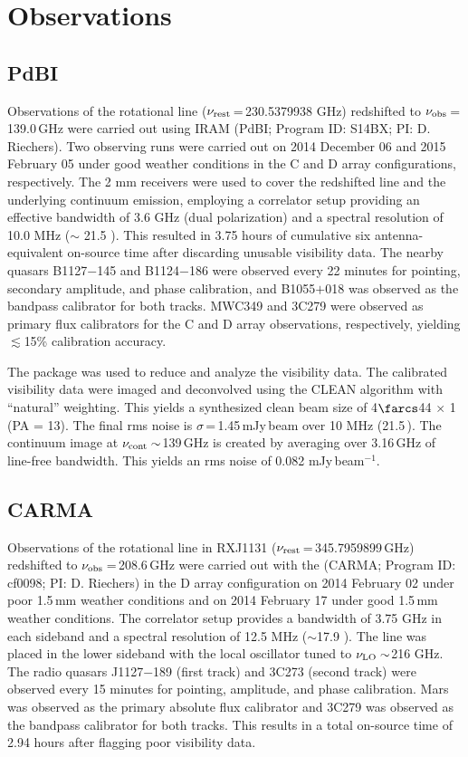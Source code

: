 \documentclass[]{emulateapj}
\begin{document}
\section{Observations} \label{sec:obs}
\subsection{PdBI \bco}
Observations of the \bco rotational line
($\nu_{\rm rest}$\,=\,230.5379938 GHz) redshifted to $\nu_{\rm obs}$\,=\,139.0\,GHz
were carried out using IRAM \pdbi (PdBI; Program ID: S14BX; PI: D.
Riechers). Two observing runs were carried out on 2014 December 06 and 2015
February 05 under good weather conditions in the C and D array configurations,
respectively. The 2 mm receivers were used to cover the redshifted \bco line
and the underlying continuum emission, employing a correlator setup providing
an effective bandwidth of 3.6 GHz (dual polarization) and a spectral resolution of 10.0 MHz ($\sim$
21.5 \kms). This resulted in 3.75 hours of cumulative six antenna-equivalent on-source
 time after discarding unusable visibility data.
The nearby quasars B1127$-$145 and B1124$-$186 were observed every 22 minutes
for pointing, secondary amplitude, and phase calibration, and B1055$+$018 was
observed as the bandpass calibrator for both tracks.
MWC349 and 3C279 were observed as primary flux calibrators for the C and D
array observations, respectively, yielding $\lesssim$15\% calibration accuracy.

The  package was used to reduce and analyze the visibility data.
The calibrated visibility data were imaged and deconvolved using the CLEAN algorithm with ``natural''
weighting. This yields a synthesized clean beam size of 4$\farcs$44 $\times$ 1 (PA = 13\degr).
The final rms noise is $\sigma$\,=\,1.45\,mJy\,beam\pmOne
over 10 MHz (21.5\,\kms). The continuum image at $\nu_{\rm cont}\sim$139\,GHz
is created by averaging over 3.16\,GHz of line-free bandwidth. This
yields an rms noise of 0.082 mJy\,beam$^{-1}$. %

\subsection{CARMA \cco}
Observations of the \cco rotational line in RXJ1131
($\nu_{\rm rest}$\,=\,345.7959899\,GHz) redshifted to $\nu_{\rm obs}$\,=\,208.6\,GHz
were carried out with the \carma (CARMA;
Program ID: cf0098; PI: D. Riechers)
in the D array configuration on 2014 February 02 under poor 1.5\,mm
weather conditions and on 2014 February 17 under good 1.5\,mm
weather conditions. The correlator setup provides a bandwidth of 3.75 GHz in
each sideband and a spectral resolution of 12.5 MHz ($\sim$17.9 \kms). The
line was placed in the lower sideband with the local oscillator tuned to $\nu_{\rm LO}\sim$216 GHz. The radio quasars J1127$-$189 (first track) and 3C273
(second track) were observed
every 15 minutes for pointing, amplitude, and phase calibration. Mars was
observed as the primary absolute flux calibrator and 3C279 was observed as
the bandpass calibrator for both tracks. This results in a total on-source time of 2.94 hours after flagging poor
visibility data.
\end{document}
